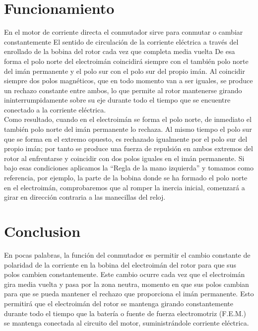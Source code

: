 \documentclass[11pt,a4paper]{article}
\begin{document}
\section{Funcionamiento}
En el motor de corriente directa el conmutador sirve para conmutar o cambiar constantemente El sentido de circulación de la corriente eléctrica a través del enrollado de la bobina del rotor  cada  vez que completa media vuelta De esa forma el polo norte del electroimán coincidirá siempre con el también polo norte del imán permanente y el polo sur con el polo sur del propio imán. Al coincidir siempre dos polos magnéticos, que en todo momento van a ser iguales, se produce un rechazo constante entre ambos, lo que permite al rotor mantenerse girando ininterrumpidamente sobre su eje durante todo el tiempo que se encuentre conectado a la corriente eléctrica.\\
Como resultado, cuando en el electroimán se forma el polo norte, de inmediato el también polo norte del imán permanente lo rechaza. Al mismo tiempo el polo sur que se forma en el extremo opuesto, es rechazado igualmente por el polo sur del propio imán; por tanto se produce una fuerza de repulsión en ambos extremos del rotor al enfrentarse y coincidir con dos polos iguales en el imán permanente. Si bajo esas condiciones aplicamos la “Regla de la mano izquierda” y tomamos como referencia, por ejemplo, la parte de la bobina donde se ha formado el polo norte en el electroimán, comprobaremos que al romper la inercia inicial, comenzará a girar en dirección contraria a las manecillas del reloj.\\


\section{Conclusion}
En pocas palabras, la función del conmutador es permitir el cambio constante de polaridad de la corriente en la bobina del electroimán del rotor para que sus polos cambien constantemente. Este cambio ocurre cada vez que el electroimán gira media vuelta y pasa por la zona neutra, momento en que sus polos cambian para que se pueda mantener el rechazo que proporciona el imán permanente. Esto permitirá que el electroimán del rotor se mantenga girando constantemente durante todo el tiempo que la batería o fuente de fuerza electromotriz (F.E.M.) se mantenga conectada al circuito del motor, suministrándole corriente eléctrica.
\end{document}
